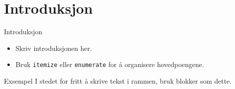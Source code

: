 \documentclass[aspectratio=169]{beamer}
\begin{document}
	\section{Introduksjon}
	
	\begin{frame}{Introduksjon}
		
		
		\begin{itemize}
			\item Skriv introduksjonen her.
			\item Bruk \texttt{itemize} eller \texttt{enumerate} for å organisere hovedpoengene.
		\end{itemize}
		
		\vskip 1cm
		
		\begin{block}{Exsempel}
			I stedet for fritt å skrive tekst i rammen, bruk blokker som dette.
		\end{block}
		
	\end{frame}
	
	
\end{document}
